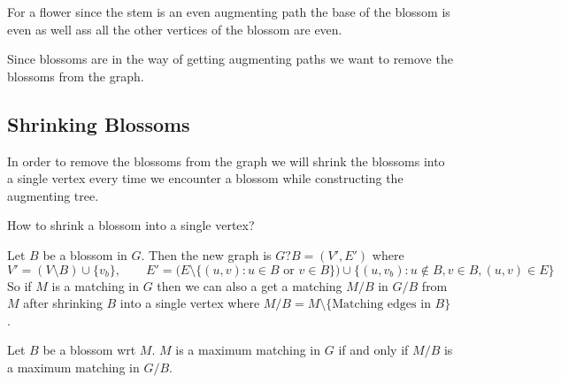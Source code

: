 \begin{observation}
	For a flower since the stem is an even augmenting path the base of the blossom is even as well ass all the other vertices of the blossom are even.
\end{observation}

Since blossoms are in the way of getting augmenting paths we want to remove the blossoms from the graph.
\subsection{Shrinking Blossoms}
In order to remove the blossoms from the graph we will shrink the blossoms into a single vertex every time we encounter a blossom while constructing the augmenting tree.
\begin{question}{}{}
	How to shrink a blossom into a single vertex?
\end{question}

Let $B$ be a blossom in $G$. Then the new graph is $G?B=(V',E')$ where $$V'=(V\setminus B)\cup \{v_b\},\qquad E'=\Big(E\setminus\{(u,v)\colon u\in B\text{ or }v\in B\}\Big)\cup \{(u,v_b)\colon u\notin B, v\in B, (u,v)\in E\}$$ So if $M$ is a matching in $G$ then we can also a get a matching $M/B$  in $G/B$ from $M$ after shrinking $B$ into  a single vertex where $M/B=M\setminus \{\text{Matching edges in $B$}\}$.
\begin{Theorem}{}{}
	Let $B$ be a blossom wrt $M$. $M$ is a maximum matching in $G$ if and only if $M/B$ is a maximum matching in $G/B$.
\end{Theorem}
